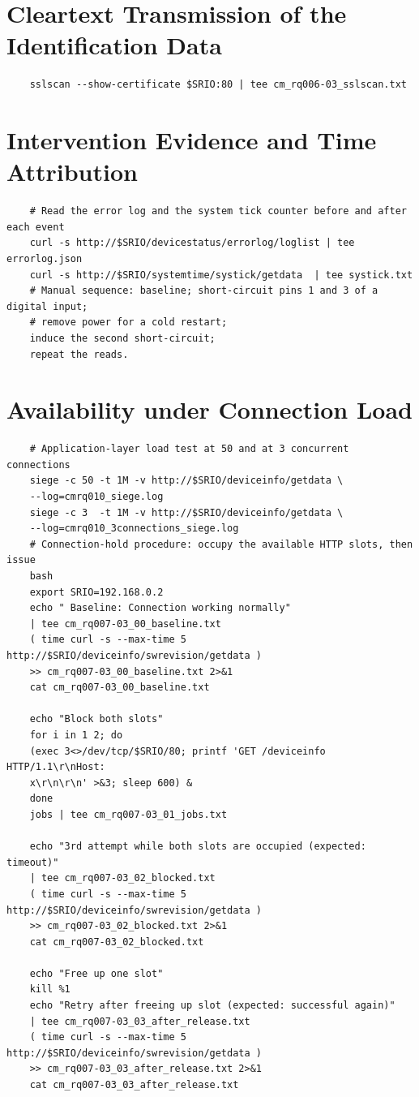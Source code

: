 \section{Cleartext Transmission of the Identification Data}
\label{app:cmd_cleartext}

\begin{verbatim}
	sslscan --show-certificate $SRIO:80 | tee cm_rq006-03_sslscan.txt
\end{verbatim}

\section{Intervention Evidence and Time Attribution}
\label{app:cmd_evidence}
\begin{verbatim}
	# Read the error log and the system tick counter before and after each event
	curl -s http://$SRIO/devicestatus/errorlog/loglist | tee errorlog.json
	curl -s http://$SRIO/systemtime/systick/getdata  | tee systick.txt
	# Manual sequence: baseline; short-circuit pins 1 and 3 of a digital input;
	# remove power for a cold restart; 
	induce the second short-circuit; 
	repeat the reads.
\end{verbatim}

\section{Availability under Connection Load}
\label{app:cmd_availability}

\begin{verbatim}
	# Application-layer load test at 50 and at 3 concurrent connections
	siege -c 50 -t 1M -v http://$SRIO/deviceinfo/getdata \
	--log=cmrq010_siege.log
	siege -c 3  -t 1M -v http://$SRIO/deviceinfo/getdata \
	--log=cmrq010_3connections_siege.log
	# Connection-hold procedure: occupy the available HTTP slots, then issue
	bash
	export SRIO=192.168.0.2
	echo " Baseline: Connection working normally" 
	| tee cm_rq007-03_00_baseline.txt
	( time curl -s --max-time 5 http://$SRIO/deviceinfo/swrevision/getdata )
	>> cm_rq007-03_00_baseline.txt 2>&1
	cat cm_rq007-03_00_baseline.txt
	
	echo "Block both slots"
	for i in 1 2; do
	(exec 3<>/dev/tcp/$SRIO/80; printf 'GET /deviceinfo HTTP/1.1\r\nHost:
	x\r\n\r\n' >&3; sleep 600) &
	done
	jobs | tee cm_rq007-03_01_jobs.txt
	
	echo "3rd attempt while both slots are occupied (expected: timeout)" 
	| tee cm_rq007-03_02_blocked.txt
	( time curl -s --max-time 5 http://$SRIO/deviceinfo/swrevision/getdata ) 
	>> cm_rq007-03_02_blocked.txt 2>&1
	cat cm_rq007-03_02_blocked.txt
	
	echo "Free up one slot"
	kill %1
	echo "Retry after freeing up slot (expected: successful again)" 
	| tee cm_rq007-03_03_after_release.txt
	( time curl -s --max-time 5 http://$SRIO/deviceinfo/swrevision/getdata ) 
	>> cm_rq007-03_03_after_release.txt 2>&1
	cat cm_rq007-03_03_after_release.txt
\end{verbatim}

